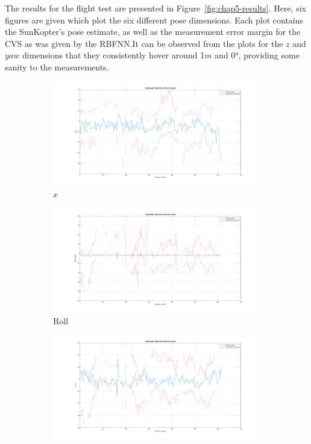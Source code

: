The results for the flight test are presented in Figure~\ref{fig:chap5-results}. Here, six figures are given which plot the six different pose dimensions. Each plot contains the SunKopter's pose estimate, as well as the measurement error margin for the CVS as was given by the RBFNN.\@ It can be observed from the plots for the $z$ and $yaw$ dimensions that they consistently hover around 1$m$ and $\ang{0}$, providing some sanity to the measurements. 
  
\begin{figure}
  \centering
  \begin{subfigure}{0.45\textwidth}
    \includegraphics[clip, trim = 150 0 120 0, width=\textwidth]{figures/chapter5/x}
    \caption{$x$}
  \end{subfigure}
  \begin{subfigure}{0.45\textwidth}
    \includegraphics[clip, trim = 150 0 120 0, width=\textwidth]{figures/chapter5/roll}
    \caption{Roll}
  \end{subfigure}
  \begin{subfigure}{0.45\textwidth}
    \includegraphics[clip, trim = 150 0 120 0, width=\textwidth]{figures/chapter5/y}

\end{subfigure}
\end{figure}

